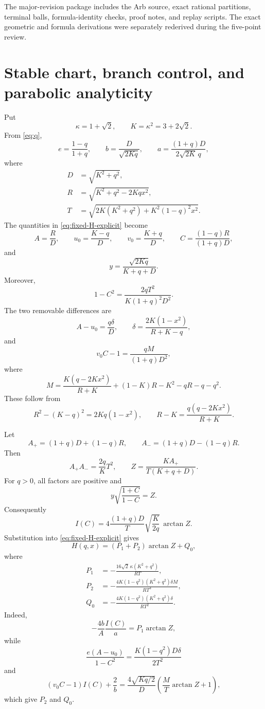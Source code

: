 \documentclass[11pt]{article}
\numberwithin{equation}{section}
\theoremstyle{remark}
\begin{document}
The major-revision package includes the Arb source, exact rational partitions, terminal balls, formula-identity checks, proof notes, and replay scripts.  The exact geometric and formula derivations were separately rederived during the five-point review.

\appendix

\section{Stable chart, branch control, and parabolic analyticity}
\label{app:q-chart}

Put
\[
  \kappa=1+\sqrt2,
  \qquad K=\kappa^2=3+2\sqrt2.
\]
From \eqref{eq:q},
\[
  e=\frac{1-q}{1+q},
  \qquad
  b=\frac D{\sqrt{2Kq}},
  \qquad
  a=\frac{(1+q)D}{2\sqrt{2K}\,q},
\]
where
\begin{align*}
  D&=\sqrt{K^2+q^2},\\
  R&=\sqrt{K^2+q^2-2Kqx^2},\\
  T&=\sqrt{2K(K^2+q^2)+K^2(1-q)^2x^2}.
\end{align*}
The quantities in \eqref{eq:fixed-H-explicit} become
\[
  A=\frac RD,
  \qquad
  u_0=\frac{K-q}{D},
  \qquad
  v_0=\frac{K+q}{D},
  \qquad
  C=\frac{(1-q)R}{(1+q)D},
\]
and
\[
  y=\frac{\sqrt{2Kq}}{K+q+D}.
\]
Moreover,
\[
  1-C^2=\frac{2qT^2}{K(1+q)^2D^2}.
\]
The two removable differences are
\[
  A-u_0=\frac{q\delta}{D},
  \qquad
  \delta=\frac{2K(1-x^2)}{R+K-q},
\]
and
\[
  v_0C-1=\frac{qM}{(1+q)D^2},
\]
where
\[
  M=\frac{K(q-2Kx^2)}{R+K}+(1-K)R-K^2-qR-q-q^2.
\]
These follow from
\[
  R^2-(K-q)^2=2Kq(1-x^2),
  \qquad
  R-K=\frac{q(q-2Kx^2)}{R+K}.
\]

Let
\[
  A_+=(1+q)D+(1-q)R,
  \qquad
  A_-=(1+q)D-(1-q)R.
\]
Then
\[
  A_+A_-=\frac{2q}{K}T^2,
  \qquad
  Z=\frac{KA_+}{T(K+q+D)}.
\]
For \(q>0\), all factors are positive and
\[
  y\sqrt{\frac{1+C}{1-C}}=Z.
\]
Consequently
\[
  I(C)=4\frac{(1+q)D}{T}\sqrt{\frac K{2q}}\,\arctan Z.
\]
Substitution into \eqref{eq:fixed-H-explicit} gives
\begin{equation}
  H(q,x)=(P_1+P_2)\arctan Z+Q_0,
  \label{eq:stable-H}
\end{equation}
where
\begin{align*}
  P_1&=-\frac{16\sqrt2\,\kappa(K^2+q^2)}{RT},\\
  P_2&=-\frac{4K(1-q^2)(K^2+q^2)\delta M}{RT^3},\\
  Q_0&=-\frac{4K(1-q^2)(K^2+q^2)\delta}{RT^2}.
\end{align*}
Indeed,
\[
  -\frac{4b}{A}\frac{I(C)}a=P_1\arctan Z,
\]
while
\[
  \frac{e(A-u_0)}{1-C^2}=\frac{K(1-q^2)D\delta}{2T^2}
\]
and
\[
  (v_0C-1)I(C)+\frac2b
  =\frac{4\sqrt{Kq/2}}D\left(\frac MT\arctan Z+1\right),
\]
which give \(P_2\) and \(Q_0\).
\end{document}
